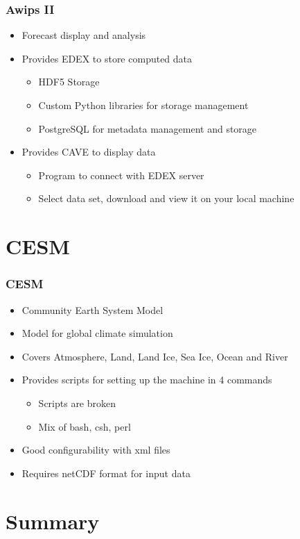 \documentclass[compress]{beamer}
\begin{document}
\begin{frame}
    \frametitle{Awips II}
    	\begin{itemize}
			\item Forecast display and analysis
			\item Provides EDEX to store computed data \cite {AwipsDocs}
	    	\begin{itemize}
		    	\item HDF5 Storage
		    	\item Custom Python libraries for storage management
		    	\item PostgreSQL for metadata management and storage
		    \end{itemize}
		    \item Provides CAVE to display data
	    	\begin{itemize}
		    	\item Program to connect with EDEX server
		    	\item Select data set, download and view it on your local machine
		    \end{itemize}
		\end{itemize}
\end{frame}

\section{CESM}
\begin{frame}
    \frametitle{CESM}
    	\begin{itemize}
    	    \item Community Earth System Model
			\item Model for global climate simulation
			\item Covers Atmosphere, Land, Land Ice, Sea Ice, Ocean and River
			\item Provides scripts for setting up the machine in 4 commands
	    	\begin{itemize}
		    	\item Scripts are broken
		    	\item Mix of bash, csh, perl
		    \end{itemize}
		    \item Good configurability with xml files
		    \item Requires netCDF format for input data \cite{CESMDocs}
		\end{itemize}
\end{frame}


\section{Summary}
\end{document}
